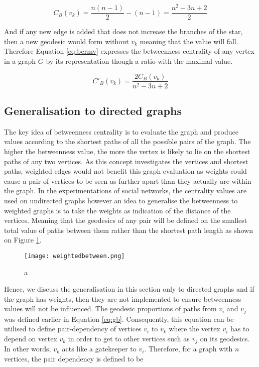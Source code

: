 \begin{equation}
C_B(v_k)= \frac{n(n-1)}{2} - (n-1) = \frac{n^2-3n+2}{2}
\end{equation}

And if any new edge is added that does not increase the branches of the star, then a new geodesic would form without $v_k$ meaning that the value will fall. Therefore Equation \ref{eq:bcrmv} expresses the betweenness centrality of any vertex in a graph $G$ by its representation though a ratio with the maximal value.

\begin{equation}\label{eq:bcrmv}
C'_B(v_k)= \frac{2C_B(v_k)}{n^2-3n+2}
\end{equation}

\subsection{Generalisation to directed graphs}
The key idea of betweenness centrality is to evaluate the graph and produce values according to the shortest paths of all the possible pairs of the graph. The higher the betweenness value, the more the vertex is likely to lie on the shortest paths of any two vertices. As this concept investigates the vertices and shortest paths, weighted edges would not benefit this graph evaluation as weights could cause a pair of vertices to be seen as further apart than they actually are within the graph. In the experimentations of social networks\cite{freeman1979centrality}, the centrality values are used on undirected graphs however an idea to generalise the betweenness to weighted graphs is to take the weights as indication of the distance of the vertices. Meaning that the geodesics of any pair will be defined on the smallest total value of paths between them rather than the shortest path length as shown on Figure \ref{fig:dbc}.

\begin{figure}[!htb]
	\centering
	\texttt{[image: weightedbetween.png]}
	\caption{a}
	\label{fig:dbc}
\end{figure}

Hence, we discuss the generalisation in this section only to directed graphs and if the graph has weights, then they are not implemented to ensure betweenness values will not be influenced. The geodesic proportions of paths from $v_i$ and $v_j$ was defined earlier in Equation \ref{eq:gb}. Consequently, this equation can be utilised to define pair-dependency of vertices $v_i$ to $v_k$ where the vertex $v_i$ has to depend on vertex $v_k$ in order to get to other vertices such as $v_j$ on its geodesics. In other words, $v_k$ acts like a gatekeeper to $v_i$. Therefore, for a graph with $n$ vertices, the pair dependency is defined to be 

